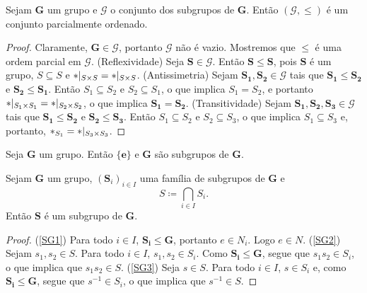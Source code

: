 \begin{prop}
Sejam $\bm G$ um grupo e $\mathcal G$ o conjunto dos subgrupos de $\bm G$. Então $(\mathcal G,\leq)$ é um conjunto parcialmente ordenado.
\end{prop}
\begin{proof}
Claramente, $\bm G \in \mathcal G$, portanto $\mathcal G$ não é vazio. Mostremos que $\leq$ é uma ordem parcial em $\mathcal G$. (Reflexividade) Seja $\bm S \in \mathcal G$. Então $\bm S \leq \bm S$, pois $\bm S$ é um grupo, $S \subseteq S$ e $\ast|_{S \times S} = \ast|_{S \times S}$. (Antissimetria) Sejam $\bm{S_1},\bm{S_2} \in \mathcal G$ tais que $\bm{S_1} \leq \bm{S_2}$ e $\bm{S_2} \leq \bm{S_1}$. Então $S_1 \subseteq S_2$ e $S_2 \subseteq S_1$, o que implica $S_1=S_2$, e portanto $\ast|_{S_1 \times S_1} = \ast|_{S_2 \times S_2}$, o que implica $\bm{S_1} = \bm{S_2}$. (Transitividade) Sejam  $\bm{S_1},\bm{S_2},\bm{S_3} \in \mathcal G$ tais que $\bm{S_1} \leq \bm{S_2}$ e $\bm{S_2} \leq \bm{S_3}$. Então $S_1 \subseteq S_2$ e $S_2 \subseteq S_3$, o que implica $S_1 \subseteq S_3$ e, portanto, $\ast_{S_1} = \ast|_{S_3 \times S_3}$.
\end{proof}

\begin{prop}
\label{alge:prop.subgru.triv}
Seja $\bm G$ um grupo. Então $\bm{\{e\}}$ e $\bm G$ são subgrupos de $\bm G$.
\end{prop}

\begin{prop}
\label{alge:prop.subgru.inter}
Sejam $\bm G$ um grupo, $(\bm S_i)_{i \in I}$ uma família de subgrupos de $\bm G$ e
	\begin{equation*}
	S \coloneqq \bigcap_{i \in I} S_i.
	\end{equation*}
Então $\bm S$ é um subgrupo de $\bm G$.
\end{prop}
\begin{proof}
(\ref{SG1}) Para todo $i \in I$, $\bm{S_i}\leq \bm G$, portanto $e \in N_i$. Logo $e \in N$. (\ref{SG2}) Sejam $s_1, s_2 \in S$. Para todo $i \in I$, $s_1,s_2 \in S_i$. Como $\bm{S_i} \leq \bm G$, segue que $s_1s_2 \in S_i$, o que implica que $s_1s_2 \in S$. (\ref{SG3}) Seja $s \in S$. Para todo $i \in I$, $s \in S_i$ e, como $\bm{S_i} \leq \bm{G}$, segue que $s^{-1} \in S_i$, o que implica que $s^{-1} \in S$.
\end{proof}


